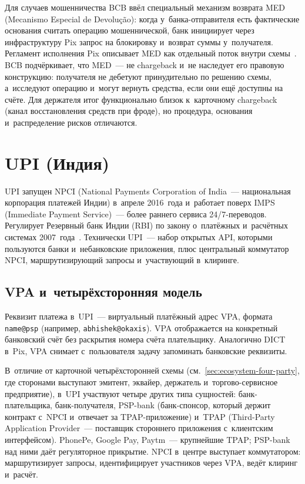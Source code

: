 Для случаев мошенничества BCB ввёл специальный механизм возврата
MED (Mecanismo Especial de Devolução): когда у~банка-отправителя есть фактические основания считать
операцию мошеннической, банк инициирует через инфраструктуру Pix
запрос на блокировку и~возврат суммы у~получателя. Регламент
исполнения Pix описывает MED как отдельный поток внутри
схемы~\cite{pix-manual-fluxos}. BCB подчёркивает, что MED~--- не
chargeback и~не наследует его правовую конструкцию: получателя не
дебетуют принудительно по решению схемы, а~исследуют операцию и~могут
вернуть средства, если они ещё доступны на счёте. Для держателя
итог функционально близок к~карточному chargeback (канал восстановления
средств при фроде), но процедура, основания и~распределение рисков
отличаются.

\section{UPI (Индия)}\label{sec:upi-system}

UPI запущен NPCI (National Payments Corporation of India~--- национальная
корпорация платежей Индии) в~апреле 2016~года и~работает поверх IMPS
(Immediate Payment Service)~--- более раннего сервиса 24/7-переводов. Регулирует Резервный банк
Индии (RBI) по закону о~платёжных и~расчётных системах
2007~года~\cite{upi}. Технически UPI~--- набор открытых API, которыми
пользуются банки и~небанковские приложения, плюс центральный
коммутатор NPCI, маршрутизирующий запросы и~участвующий в~клиринге.

\subsection*{VPA и~четырёхсторонняя модель}\label{subsec:upi-fourparty}

Реквизит платежа в~UPI~--- виртуальный платёжный адрес VPA, формата
\texttt{name@psp} (например, \texttt{abhishek@okaxis}). VPA отображается
на конкретный банковский счёт без раскрытия номера счёта плательщику.
Аналогично DICT в~Pix, VPA снимает с~пользователя задачу запоминать
банковские реквизиты.

В~отличие от карточной четырёхсторонней схемы (см.~\ref{sec:ecosystem-four-party},
где сторонами выступают эмитент, эквайер, держатель и~торгово-сервисное
предприятие), в~UPI участвуют четыре других типа сущностей: банк-плательщика,
банк-получателя, PSP-bank (банк-спонсор, который держит контракт с~NPCI и~отвечает
за TPAP-приложение) и~TPAP (Third-Party Application Provider~---
поставщик стороннего приложения с~клиентским интерфейсом). PhonePe, Google Pay, Paytm~--- крупнейшие
TPAP; PSP-bank над ними даёт регуляторное прикрытие. NPCI в~центре
выступает коммутатором: маршрутизирует запросы, идентифицирует
участников через VPA, ведёт клиринг и~расчёт.

